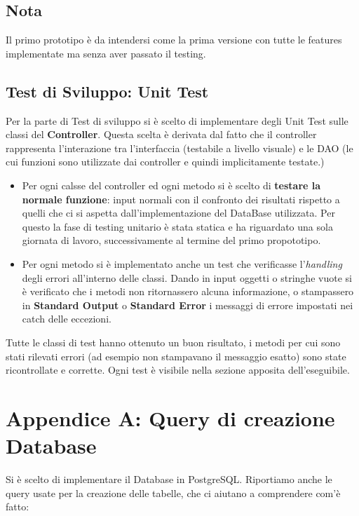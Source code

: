 \documentclass{article}
\begin{document}
    \subsection*{Nota}
        Il primo prototipo è da intendersi come la prima versione con tutte le features implementate ma senza aver passato il testing.

    \subsection{Test di Sviluppo: Unit Test}
    Per la parte di Test di sviluppo si è scelto di implementare degli Unit Test sulle classi del \textbf{Controller}. Questa scelta è derivata dal fatto che il controller rappresenta l'interazione tra l'interfaccia (testabile a livello visuale) e le DAO (le cui funzioni sono utilizzate dai controller e quindi implicitamente testate.)\\
    \begin{itemize}
        \item Per ogni calsse del controller ed ogni metodo si è scelto di \textbf{testare la normale funzione}: input normali con il confronto dei risultati rispetto a quelli che ci si aspetta dall'implementazione del DataBase utilizzata. Per questo la fase di testing unitario è stata statica e ha riguardato una sola giornata di lavoro, successivamente al termine del primo propototipo.
        \item Per ogni metodo si è implementato anche un test che verificasse l'\textit{handling} degli errori all'interno delle classi. Dando in input oggetti o stringhe vuote si è verificato che i metodi non ritornassero alcuna informazione, o stampassero in \textbf{Standard Output} o \textbf{Standard Error} i messaggi di errore impostati nei catch delle eccezioni.
    \end{itemize}
    Tutte le classi di test hanno ottenuto un buon risultato, i metodi per cui sono stati rilevati errori (ad esempio non stampavano il messaggio esatto) sono state ricontrollate e corrette. Ogni test è visibile nella sezione apposita dell'eseguibile.

\newpage
    \section*{Appendice A: Query di creazione Database}

    Si è scelto di implementare il Database in PostgreSQL. Riportiamo anche le query usate per la creazione delle tabelle, che ci aiutano a comprendere com'è fatto:
\end{document}
